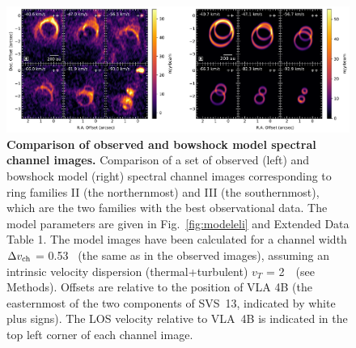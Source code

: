 \documentclass[12pt]{mythesis}
\begin{document}
\clearpage
\begin{figure}[p!]
\begin{center}
\includegraphics[width=1.0\textwidth]{figures/obs_model_channels.pdf}
\caption[ Comparison of observed and bowshock model spectral channel images]{{\bf Comparison of observed and bowshock model spectral channel images.} Comparison of a set of observed (left) and bowshock model (right) spectral channel images corresponding to ring families II (the northernmost) and III (the southernmost), which are the two families with the best observational data. The model parameters are given in Fig.~\ref{fig:modeleli} and Extended Data Table 1. The model images have been calculated for a channel width $\Delta v_{\rm ch}$ = 0.53 \kms\ (the same as in the observed images), assuming an intrinsic velocity dispersion (thermal+turbulent) $v_T$ = 2~\kms\ (see Methods). Offsets are relative to the position of VLA 4B (the easternmost of the two components of SVS~13, indicated by white plus signs). The LOS velocity relative to VLA~4B is indicated in the top left corner of each channel image.
}
\label{fig:modelchan}%
\end{center}
 \end{figure}
\end{document}
